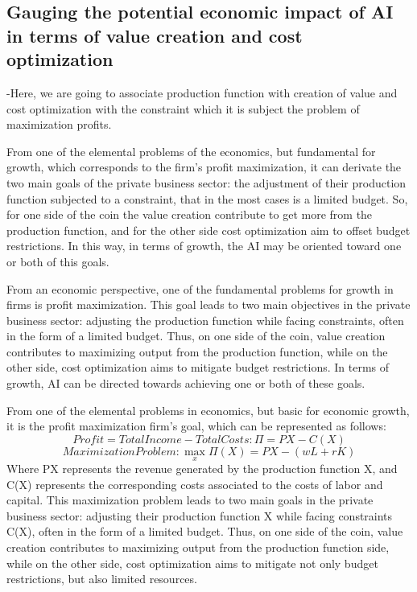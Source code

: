 \documentclass[preprint, 3p,
authoryear]{elsarticle} %
\begin{document}
\hypertarget{gauging-the-potential-economic-impact-of-ai-in-terms-of-value-creation-and-cost-optimization}{%
\subsection{Gauging the potential economic impact of AI in terms of
value creation and cost
optimization}\label{gauging-the-potential-economic-impact-of-ai-in-terms-of-value-creation-and-cost-optimization}}

-Here, we are going to associate production function with creation of
value and cost optimization with the constraint which it is subject the
problem of maximization profits.

From one of the elemental problems of the economics, but fundamental for
growth, which corresponds to the firm's profit maximization, it can
derivate the two main goals of the private business sector: the
adjustment of their production function subjected to a constraint, that
in the most cases is a limited budget. So, for one side of the coin the
value creation contribute to get more from the production function, and
for the other side cost optimization aim to offset budget restrictions.
In this way, in terms of growth, the AI may be oriented toward one or
both of this goals.

From an economic perspective, one of the fundamental problems for growth
in firms is profit maximization. This goal leads to two main objectives
in the private business sector: adjusting the production function while
facing constraints, often in the form of a limited budget. Thus, on one
side of the coin, value creation contributes to maximizing output from
the production function, while on the other side, cost optimization aims
to mitigate budget restrictions. In terms of growth, AI can be directed
towards achieving one or both of these goals.

From one of the elemental problems in economics, but basic for economic
growth, it is the profit maximization firm's goal, which can be
represented as follows: \[
Profit = Total Income - Total Costs: \Pi = PX - C(X)
\] \[
Maximization Problem: \max_{x} \Pi(X) = PX - (wL + rK)
\] Where PX represents the revenue generated by the production function
X, and C(X) represents the corresponding costs associated to the costs
of labor and capital. This maximization problem leads to two main goals
in the private business sector: adjusting their production function X
while facing constraints C(X), often in the form of a limited budget.
Thus, on one side of the coin, value creation contributes to maximizing
output from the production function side, while on the other side, cost
optimization aims to mitigate not only budget restrictions, but also
limited resources.
\end{document}
